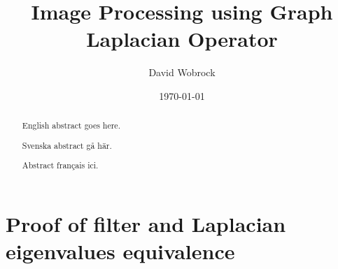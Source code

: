 \documentclass[]{kththesis}
\title{Image Processing using Graph Laplacian Operator}
\author{David Wobrock}
\date{\today}
\begin{document}
\frontmatter %

\titlepage

\begin{abstract}
  English abstract goes here.
\end{abstract}

\begin{otherlanguage}{swedish}
  \begin{abstract}
   Svenska abstract gå här.
  \end{abstract}
\end{otherlanguage}

\begin{otherlanguage}{french}
  \begin{abstract}
   Abstract français ici.
  \end{abstract}
\end{otherlanguage}

\tableofcontents

\mainmatter %









\clearpage
\printbibliography

\appendix %

\chapter{Proof of filter and Laplacian eigenvalues equivalence}
\label{appendix:eigenvalue_proof}

\end{document}
